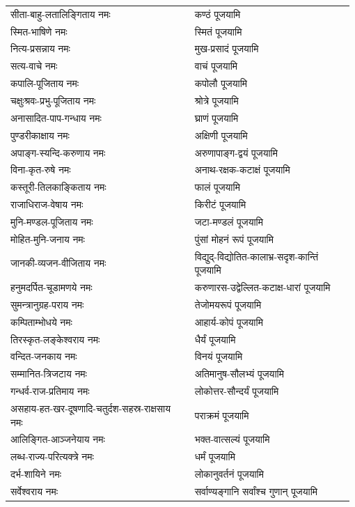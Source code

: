 \begin{center}
\begin{supertabular}{p{0.525\linewidth}p{0.45\linewidth}}
सीता-बाहु-लतालिङ्गिताय नमः & कण्ठं पूजयामि\\
स्मित-भाषिणे नमः & स्मितं पूजयामि\\
नित्य-प्रसन्नाय नमः & मुख-प्रसादं पूजयामि\\
सत्य-वाचे नमः & वाचं पूजयामि\\
कपालि-पूजिताय नमः & कपोलौ पूजयामि\\
चक्षुःश्रवः-प्रभु-पूजिताय नमः & श्रोत्रे पूजयामि\\
अनासादित-पाप-गन्धाय नमः & घ्राणं पूजयामि\\
पुण्डरीकाक्षाय नमः & अक्षिणी पूजयामि\\
अपाङ्ग-स्यन्दि-करुणाय नमः & अरुणापाङ्ग-द्वयं पूजयामि\\
विना-कृत-रुषे नमः & अनाथ-रक्षक-कटाक्षं पूजयामि\\
कस्तूरी-तिलकाङ्किताय नमः & फालं पूजयामि\\
राजाधिराज-वेषाय नमः & किरीटं पूजयामि\\
मुनि-मण्डल-पूजिताय नमः & जटा-मण्डलं पूजयामि\\
मोहित-मुनि-जनाय नमः & पुंसां मोहनं रूपं पूजयामि\\
जानकी-व्यजन-वीजिताय नमः & विद्युद्-विद्योतित-कालाभ्र-सदृश-कान्तिं पूजयामि\\
हनुमदर्पित-चूडामणये नमः & करुणारस-उद्वेल्लित-कटाक्ष-धारां पूजयामि\\
सुमन्त्रानुग्रह-पराय नमः & तेजोमयरूपं पूजयामि\\
कम्पिताम्भोधये नमः & आहार्य-कोपं पूजयामि\\
तिरस्कृत-लङ्केश्वराय नमः & धैर्यं पूजयामि\\
वन्दित-जनकाय नमः & विनयं पूजयामि\\
सम्मानित-त्रिजटाय नमः & अतिमानुष-सौलभ्यं पूजयामि\\
गन्धर्व-राज-प्रतिमाय नमः & लोकोत्तर-सौन्दर्यं पूजयामि\\
असहाय-हत-खर-दूषणादि-चतुर्दश-सहस्र-राक्षसाय नमः & पराक्रमं पूजयामि\\
आलिङ्गित-आञ्जनेयाय नमः & भक्त-वात्सल्यं पूजयामि\\
लब्ध-राज्य-परित्यक्त्रे नमः & धर्मं पूजयामि\\
दर्भ-शायिने नमः & लोकानुवर्तनं पूजयामि\\
सर्वेश्वराय नमः & सर्वाण्यङ्गानि सर्वांश्च गुणान् पूजयामि\\
\end{supertabular}

\begingroup
\setlength{\columnseprule}{1pt}
\let\chapt\sect
\centering






\endgroup


\end{center}

